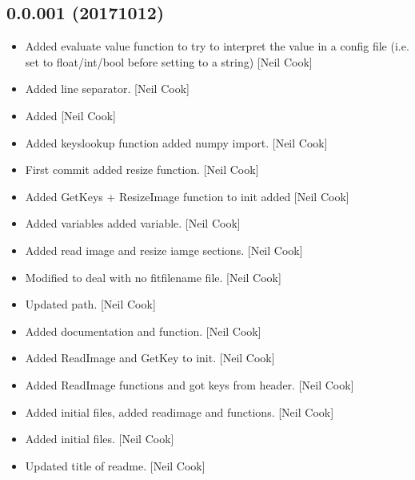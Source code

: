 \documentclass[a4paper,10pt,english]{report}
\begin{document}
\subsection{0.0.001 (2017\sphinxhyphen{}10\sphinxhyphen{}12)}
\label{\detokenize{misc/changelog:id568}}\begin{itemize}
\item {} 
Added evaluate value function to try to interpret the value in a
config file (i.e. set to float/int/bool before setting to a string)
{[}Neil Cook{]}

\item {} 
Added line separator. {[}Neil Cook{]}

\item {} 
Added  {[}Neil Cook{]}

\item {} 
Added keyslookup function added numpy import. {[}Neil Cook{]}

\item {} 
First commit added resize function. {[}Neil Cook{]}

\item {} 
Added GetKeys + ResizeImage function to init added  {[}Neil
Cook{]}

\item {} 
Added  variables added 
variable. {[}Neil Cook{]}

\item {} 
Added read image and resize iamge sections. {[}Neil Cook{]}

\item {} 
Modified  to deal with no fitfilename file. {[}Neil Cook{]}

\item {} 
Updated  path. {[}Neil Cook{]}

\item {} 
Added  documentation and
 function. {[}Neil Cook{]}

\item {} 
Added ReadImage and GetKey to init. {[}Neil Cook{]}

\item {} 
Added ReadImage functions and got keys from header. {[}Neil Cook{]}

\item {} 
Added initial files, added readimage and  functions.
{[}Neil Cook{]}

\item {} 
Added initial files. {[}Neil Cook{]}

\item {} 
Updated title of readme. {[}Neil Cook{]}

\end{itemize}



\renewcommand{\indexname}{Index}
\printindex
\end{document}
